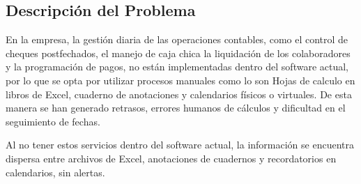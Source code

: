 \subsection{Descripción del Problema}

En la empresa, la gestión diaria de las operaciones contables, como el control de cheques postfechados, el manejo de caja chica la liquidación de los colaboradores y la programación de pagos, no están implementadas dentro del software actual, por lo que se opta por utilizar procesos manuales como lo son Hojas de calculo en libros de Excel, cuaderno de anotaciones y calendarios físicos o virtuales. De esta manera se han generado retrasos, errores humanos de cálculos y dificultad en el seguimiento de fechas. 

Al no tener estos servicios dentro del software actual, la información se encuentra dispersa entre archivos de Excel, anotaciones de cuadernos y recordatorios en calendarios, sin alertas.


